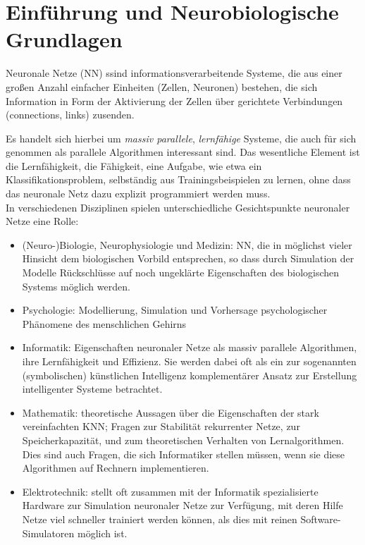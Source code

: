 \section*{Einführung und Neurobiologische Grundlagen}%
\begin{mytheo}{Neuronale Netze (NN)}
ssind informationsverarbeitende Systeme, die aus einer großen Anzahl einfacher Einheiten (Zellen, Neuronen)
bestehen, die sich Information in Form der Aktivierung der Zellen über
gerichtete Verbindungen (connections, links) zusenden.
\end{mytheo}
\noindent
Es  handelt sich hierbei um \textit{massiv parallele}, \textit{lernfähige} Systeme, die auch für sich
genommen als parallele Algorithmen interessant sind. 
Das wesentliche Element ist die Lernfähigkeit, die Fähigkeit, eine Aufgabe, wie etwa ein
Klassifikationsproblem, selbständig aus Trainingsbeispielen zu lernen, ohne dass
das neuronale Netz dazu explizit programmiert werden muss.\\
In verschiedenen Disziplinen spielen unterschiedliche
Gesichtspunkte neuronaler Netze eine Rolle:
\begin{itemize}[noitemsep]
\item (Neuro-)Biologie, Neurophysiologie und Medizin: NN, die in möglichst vieler
Hinsicht dem biologischen Vorbild entsprechen, so dass durch Simulation der
Modelle Rückschlüsse auf noch ungeklärte Eigenschaften des biologischen
Systems möglich werden. 
\item Psychologie: Modellierung, Simulation und Vorhersage psychologischer Phänomene des menschlichen Gehirns
\item Informatik: Eigenschaften neuronaler Netze als massiv parallele Algorithmen,
 ihre Lernfähigkeit und Effizienz. Sie werden dabei oft als ein zur
sogenannten (symbolischen) künstlichen Intelligenz komplementärer Ansatz zur
Erstellung intelligenter Systeme betrachtet.
\item Mathematik: theoretische Aussagen über die Eigenschaften der stark
vereinfachten KNN; Fragen zur Stabilität
rekurrenter Netze, zur Speicherkapazität, und zum theoretischen Verhalten von
Lernalgorithmen. Dies sind auch Fragen, die sich Informatiker stellen müssen,
wenn sie diese Algorithmen auf Rechnern implementieren.
\item Elektrotechnik: stellt oft zusammen
mit der Informatik spezialisierte Hardware zur Simulation neuronaler Netze zur
Verfügung, mit deren Hilfe Netze viel schneller trainiert werden können, als dies
mit reinen Software-Simulatoren möglich ist.
\end{itemize} 

